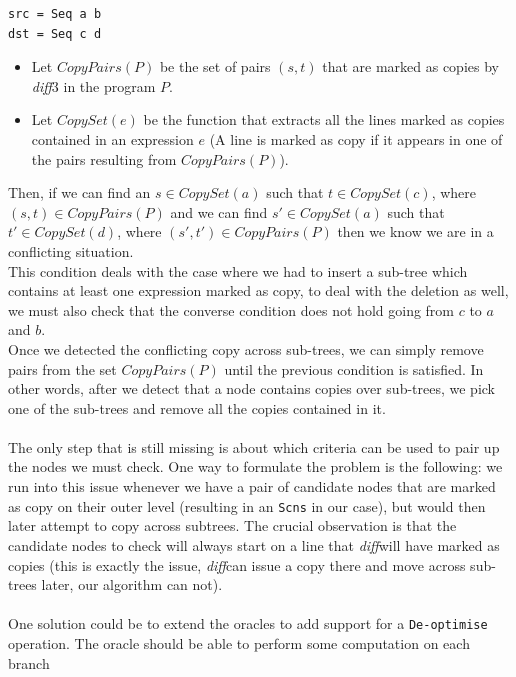 \documentclass[11pt, titlepage]{article}
\newcommand{\diff}{\emph{diff}}
\begin{document}
\begin{verbatim}
src = Seq a b
dst = Seq c d
\end{verbatim}


\begin{itemize}
  \item Let $CopyPairs(P)$ be the set of pairs $(s,t)$ that are marked as copies by \diff3 in the program $P$.

\item Let $CopySet(e)$ be the function that extracts all the lines marked as copies 
contained in an expression $e$ (A line is marked as copy if it appears in one of the pairs resulting from $CopyPairs(P)$).
\end{itemize}

Then, if we can find an $s \in CopySet(a)$ such that $t \in CopySet(c)$, where $(s,t) \in CopyPairs(P)$ and we can find $s' \in CopySet(a)$ such that $t' \in CopySet(d)$, where $(s',t') \in CopyPairs(P)$ then we know we are in a conflicting situation. 
\\
This condition deals with the case where we had to insert a sub-tree which 
contains at least one expression marked as copy, to deal with the deletion as well, we 
must also check that the converse condition does not hold going from $c$ to $a$ 
and $b$.
\\
Once we detected the conflicting copy across sub-trees, we can simply remove pairs from the set $CopyPairs(P)$ until the previous condition is satisfied. In other words, after we detect that a node contains copies over sub-trees, we pick one of the sub-trees and remove all the copies contained in it.
\\
\\
The only step that is still missing is about which criteria can be used to pair up the nodes we must check. 
One way to formulate the problem is the following: we run into this issue whenever we have a pair of candidate nodes that are marked as copy on their outer level (resulting in an \texttt{Scns} in our case), but would then later attempt to copy across subtrees.  
The crucial observation is that the candidate nodes to check will always start on a line that \diff will have marked as copies (this is exactly the issue, \diff can issue a copy there and move across sub-trees later, our algorithm can not). 
\\
\\
One solution could be to extend the oracles to add support for a \texttt{De-optimise} operation. The oracle should be able to perform some computation on each branch 
\end{document}
